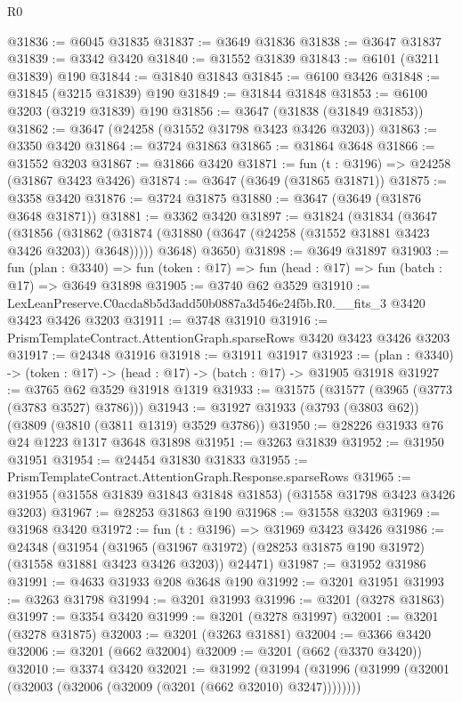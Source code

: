 \begin{lexlean}{R0}
\begin{coremodule}
@31836 := @6045 @31835
@31837 := @3649 @31836
@31838 := @3647 @31837
@31839 := @3342 @3420
@31840 := @31552 @31839
@31843 := @6101 (@3211 @31839) @190
@31844 := @31840 @31843
@31845 := @6100 @3426
@31848 := @31845 (@3215 @31839) @190
@31849 := @31844 @31848
@31853 := @6100 @3203 (@3219 @31839) @190
@31856 := @3647 (@31838 (@31849 @31853))
@31862 := @3647 (@24258 (@31552 @31798 @3423 @3426 @3203))
@31863 := @3350 @3420
@31864 := @3724 @31863
@31865 := @31864 @3648
@31866 := @31552 @3203
@31867 := @31866 @3420
@31871 := fun (t : @3196) => @24258 (@31867 @3423 @3426)
@31874 := @3647 (@3649 (@31865 @31871))
@31875 := @3358 @3420
@31876 := @3724 @31875
@31880 := @3647 (@3649 (@31876 @3648 @31871))
@31881 := @3362 @3420
@31897 := @31824
    (@31834
      (@3647
        (@31856 (@31862 (@31874 (@31880 (@3647 (@24258 (@31552 @31881 @3423 @3426 @3203)) @3648)))))
        @3648)
      @3650)
@31898 := @3649 @31897
@31903 := fun (plan : @3340) =>
  fun (token : @17) => fun (head : @17) => fun (batch : @17) => @3649 @31898
@31905 := @3740 @62 @3529
@31910 := LexLeanPreserve.C0acda8b5d3add50b0887a3d546e24f5b.R0.__fits_3 @3420 @3423 @3426 @3203
@31911 := @3748 @31910
@31916 := PrismTemplateContract.AttentionGraph.sparseRows @3420 @3423 @3426 @3203
@31917 := @24348 @31916
@31918 := @31911 @31917
@31923 := (plan : @3340) -> (token : @17) -> (head : @17) -> (batch : @17) -> @31905 @31918
@31927 := @3765 @62 @3529 @31918 @1319
@31933 := @31575 (@31577 (@3965 (@3773 (@3783 @3527) @3786)))
@31943 := @31927 @31933 (@3793 (@3803 @62)) (@3809 (@3810 (@3811 @1319) @3529 @3786))
@31950 := @28226 @31933 @76 @24 @1223 @1317 @3648 @31898
@31951 := @3263 @31839
@31952 := @31950 @31951
@31954 := @24454 @31830 @31833
@31955 := PrismTemplateContract.AttentionGraph.Response.sparseRows
@31965 := @31955 (@31558 @31839 @31843 @31848 @31853) (@31558 @31798 @3423 @3426 @3203)
@31967 := @28253 @31863 @190
@31968 := @31558 @3203
@31969 := @31968 @3420
@31972 := fun (t : @3196) => @31969 @3423 @3426
@31986 := @24348
    (@31954
      (@31965 (@31967 @31972) (@28253 @31875 @190 @31972) (@31558 @31881 @3423 @3426 @3203))
      @24471)
@31987 := @31952 @31986
@31991 := @4633 @31933 @208 @3648 @190
@31992 := @3201 @31951
@31993 := @3263 @31798
@31994 := @3201 @31993
@31996 := @3201 (@3278 @31863)
@31997 := @3354 @3420
@31999 := @3201 (@3278 @31997)
@32001 := @3201 (@3278 @31875)
@32003 := @3201 (@3263 @31881)
@32004 := @3366 @3420
@32006 := @3201 (@662 @32004)
@32009 := @3201 (@662 (@3370 @3420))
@32010 := @3374 @3420
@32021 := @31992
    (@31994 (@31996 (@31999 (@32001 (@32003 (@32006 (@32009 (@3201 (@662 @32010) @3247))))))))

\end{coremodule}
\end{lexlean}
